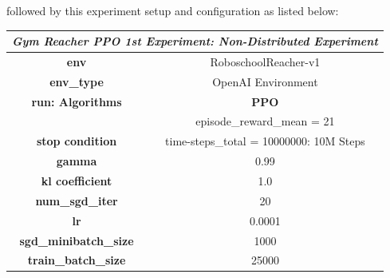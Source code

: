 followed by this experiment setup and configuration as listed below:
\begin{table}[!htb]
		\centering
		\begin{tabular}{|c|l|l|c|l|l|}
				\hline
				\multicolumn{6}{|c|}{\textit{\textbf{Gym Reacher PPO 1st Experiment: Non-Distributed Experiment}}}                                                        \\ \hline
				\multicolumn{3}{|c|}{\textbf{env}}                                  & \multicolumn{3}{c|}{RoboschoolReacher-v1}                                           \\ \hline
				\multicolumn{3}{|c|}{\textbf{env\_type}}                            & \multicolumn{3}{c|}{OpenAI Environment}                                             \\ \hline
				\multicolumn{3}{|c|}{\textbf{run: Algorithms}}                      & \multicolumn{3}{c|}{\cellcolor[HTML]{C0C0C0}\textbf{PPO}}                           \\ \hline
				\multicolumn{3}{|c|}{}                                              & \multicolumn{3}{c|}{\cellcolor[HTML]{E1F7E1}episode\_reward\_mean = 21}             \\ \cline{4-6} 
				\multicolumn{3}{|c|}{\multirow{-2}{*}{\textbf{stop condition}}}     & \multicolumn{3}{c|}{\cellcolor[HTML]{E1F7E1}time-steps\_total = 10000000: 10M Steps} \\ \hline
				\multicolumn{3}{|c|}{\textbf{gamma}}                                & \multicolumn{3}{c|}{0.99}                                                           \\ \hline
				\multicolumn{3}{|c|}{\textbf{kl coefficient}}                            & \multicolumn{3}{c|}{1.0}                                                            \\ \hline
				\multicolumn{3}{|c|}{\textbf{num\_sgd\_iter}}                       & \multicolumn{3}{c|}{20}                                                             \\ \hline
				\multicolumn{3}{|c|}{\textbf{lr}}                                   & \multicolumn{3}{c|}{0.0001}                                                         \\ \hline
				\multicolumn{3}{|c|}{\textbf{sgd\_minibatch\_size}}                 & \multicolumn{3}{c|}{1000}                                                           \\ \hline
				\multicolumn{3}{|c|}{\textbf{train\_batch\_size}}                   & \multicolumn{3}{c|}{25000}                                                          \\ \hline

\end{tabular}
\end{table}

